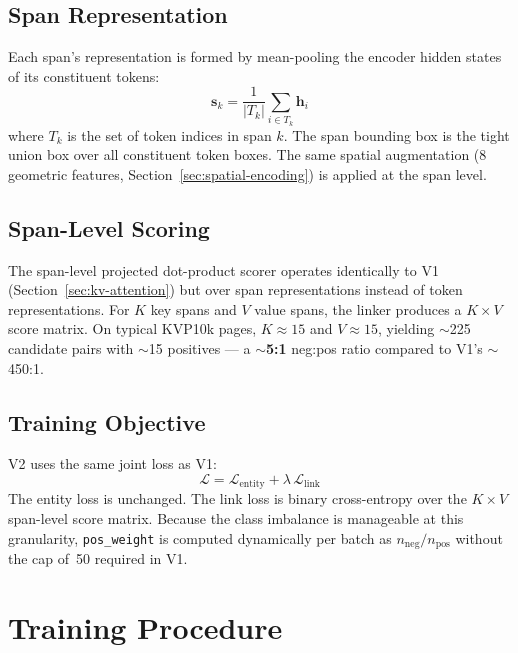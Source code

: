 \subsection{Span Representation}
\label{sec:span-representation}

Each span's representation is formed by mean-pooling the encoder hidden states
of its constituent tokens:
\[
  \mathbf{s}_k = \frac{1}{|T_k|} \sum_{i \in T_k} \mathbf{h}_i
\]
where $T_k$ is the set of token indices in span $k$. The span bounding box
is the tight union box over all constituent token boxes. The same spatial
augmentation (8 geometric features, Section~\ref{sec:spatial-encoding}) is
applied at the span level.

\subsection{Span-Level Scoring}
\label{sec:span-scoring}

The span-level projected dot-product scorer operates identically to V1
(Section~\ref{sec:kv-attention}) but over span representations instead of
token representations. For $K$ key spans and $V$ value spans, the linker
produces a $K \times V$ score matrix. On typical KVP10k pages, $K \approx 15$
and $V \approx 15$, yielding $\sim$225 candidate pairs with
$\sim$15 positives --- a \textbf{$\sim$5:1} neg:pos ratio compared to V1's
$\sim$450:1.

\subsection{Training Objective}
\label{sec:v2-training}

V2 uses the same joint loss as V1:
\begin{equation}
  \label{eq:joint-loss}
  \mathcal{L} = \mathcal{L}_{\text{entity}} + \lambda\,\mathcal{L}_{\text{link}}
\end{equation}
The entity loss is unchanged. The link loss is binary cross-entropy over the
$K \times V$ span-level score matrix. Because the class imbalance is
manageable at this granularity, \texttt{pos\_weight} is computed dynamically
per batch as $n_{\text{neg}}/n_{\text{pos}}$ without the cap of~50 required
in V1.

\section{Training Procedure}
\label{sec:training-procedure}

